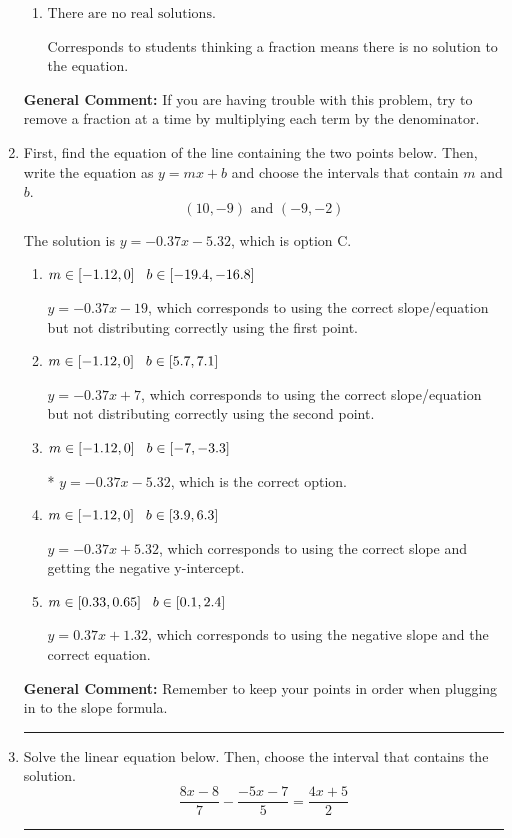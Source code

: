 \documentclass{extbook}[14pt]
\newcommand{\litem}[1]{\item #1

\rule{\textwidth}{0.4pt}}
\begin{document}
\begin{enumerate}
{\begin{enumerate}[label=\Alph*.]
 $x = 0.646$, which corresponds to dividing the second number in the numerator by the denominator rather than dividing BOTH parts of the numerator by the denominator (or removing the fractions through multiplication).
\item \( \text{There are no real solutions.} \)

Corresponds to students thinking a fraction means there is no solution to the equation.
\end{enumerate}

\textbf{General Comment:} If you are having trouble with this problem, try to remove a fraction at a time by multiplying each term by the denominator.
}
\litem{
First, find the equation of the line containing the two points below. Then, write the equation as $ y=mx+b $ and choose the intervals that contain $m$ and $b$.
\[ (10, -9) \text{ and } (-9, -2) \]

The solution is \( y = -0.37x -5.32 \), which is option C.\begin{enumerate}[label=\Alph*.]
\item \( m \in [-1.12, 0] \hspace*{3mm} b \in [-19.4, -16.8] \)

 $y = -0.37x -19$, which corresponds to using the correct slope/equation but not distributing correctly using the first point.
\item \( m \in [-1.12, 0] \hspace*{3mm} b \in [5.7, 7.1] \)

 $y = -0.37x + 7$, which corresponds to using the correct slope/equation but not distributing correctly using the second point.
\item \( m \in [-1.12, 0] \hspace*{3mm} b \in [-7, -3.3] \)

* $y = -0.37x -5.32$, which is the correct option.
\item \( m \in [-1.12, 0] \hspace*{3mm} b \in [3.9, 6.3] \)

 $y = -0.37x + 5.32$, which corresponds to using the correct slope and getting the negative y-intercept.
\item \( m \in [0.33, 0.65] \hspace*{3mm} b \in [0.1, 2.4] \)

 $y = 0.37x + 1.32$, which corresponds to using the negative slope and the correct equation.
\end{enumerate}

\textbf{General Comment:} Remember to keep your points in order when plugging in to the slope formula.
}
\litem{
Solve the linear equation below. Then, choose the interval that contains the solution.
\[ \frac{8x -8}{7} - \frac{-5x -7}{5} = \frac{4x + 5}{2} \]

}
\end{enumerate}
\end{document}
